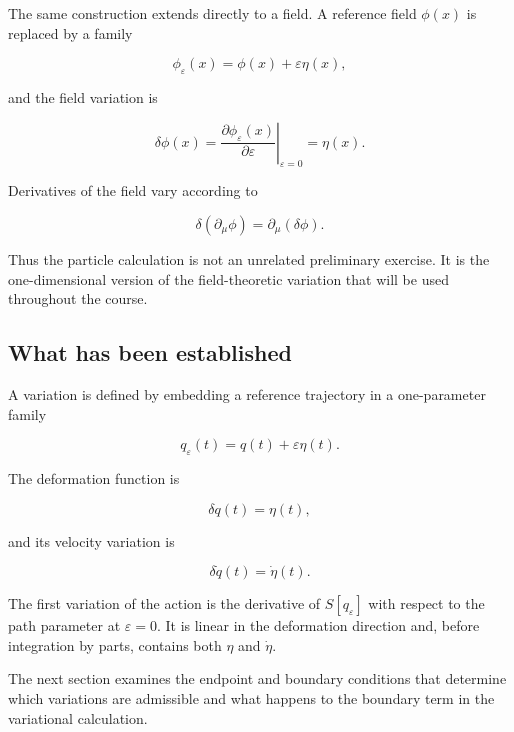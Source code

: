 The same construction extends directly to a field. A reference field \(\phi(x)\) is replaced by a family

\[
\phi_{\varepsilon}(x)
=
\phi(x)+\varepsilon\eta(x),
\]

and the field variation is

\[
\delta\phi(x)
=
\left.
\frac{\partial\phi_{\varepsilon}(x)}{\partial\varepsilon}
\right|_{\varepsilon=0}
=
\eta(x).
\]

Derivatives of the field vary according to

\[
\delta(\partial_{\mu}\phi)
=
\partial_{\mu}(\delta\phi).
\]

Thus the particle calculation is not an unrelated preliminary exercise. It is the one-dimensional version of the field-theoretic variation that will be used throughout the course.

\subsection{What has been established}

A variation is defined by embedding a reference trajectory in a one-parameter family

\[
q_{\varepsilon}(t)
=
q(t)+\varepsilon\eta(t).
\]

The deformation function is

\[
\delta q(t)=\eta(t),
\]

and its velocity variation is

\[
\delta\dot q(t)=\dot\eta(t).
\]

The first variation of the action is the derivative of \(S[q_{\varepsilon}]\) with respect to the path parameter at \(\varepsilon=0\). It is linear in the deformation direction and, before integration by parts, contains both \(\eta\) and \(\dot\eta\).

The next section examines the endpoint and boundary conditions that determine which variations are admissible and what happens to the boundary term in the variational calculation.